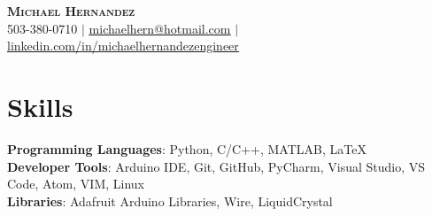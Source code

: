\documentclass[letterpaper,11pt]{article}
\begin{document}

\begin{center}
    \textbf{\Huge \scshape Michael Hernandez} \\ \vspace{1pt}
    \small 503-380-0710 $|$ \href{mailto:michaelhern@hotmail.com}{\underline{michaelhern@hotmail.com}} $|$ 
    \href{https://linkedin.com/in/...}{\underline{linkedin.com/in/michaelhernandezengineer}} %
\end{center}

\begin{comment}
\section{Summary}
\begin{itemize}[leftmargin=0.15in, label={}]
	\small{\item{Software engineering professional proficient in Python, and C++ with prior experience in embedded software validation and development.}}
\end{itemize}
\end{comment}

%
\section{Skills}
\begin{itemize}[leftmargin=0.15in, label={}]
	\small{\item{
			\textbf{Programming Languages}{: 
				Python, 
				C/C++, 
				MATLAB, 
				LaTeX
				} \\
			\textbf{Developer Tools}{: 
				Arduino IDE,
				Git, 
				GitHub, 
				PyCharm, 
				Visual Studio, 
				VS Code, 
				Atom, 
				VIM,
				Linux
				} \\
			\textbf{Libraries}{: 
				Adafruit Arduino Libraries, 
				Wire, 
				LiquidCrystal
				} \\
	}}
\end{itemize}
\end{document}
